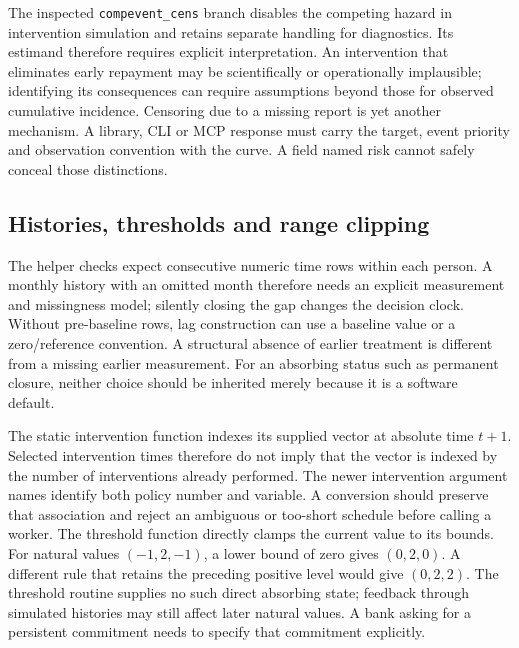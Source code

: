 The inspected \texttt{compevent\_cens} branch disables the competing hazard in intervention simulation and retains separate handling for diagnostics. Its estimand therefore requires explicit interpretation. An intervention that eliminates early repayment may be scientifically or operationally implausible; identifying its consequences can require assumptions beyond those for observed cumulative incidence. Censoring due to a missing report is yet another mechanism. A library, CLI or MCP response must carry the target, event priority and observation convention with the curve. A field named risk cannot safely conceal those distinctions.

\subsection{Histories, thresholds and range clipping}
\label{exec20:gformula-history}
The helper checks expect consecutive numeric time rows within each person. A monthly history with an omitted month therefore needs an explicit measurement and missingness model; silently closing the gap changes the decision clock. Without pre-baseline rows, lag construction can use a baseline value or a zero/reference convention. A structural absence of earlier treatment is different from a missing earlier measurement. For an absorbing status such as permanent closure, neither choice should be inherited merely because it is a software default.~\citep{exec20_gformula_reuse}

The static intervention function indexes its supplied vector at absolute time $t+1$. Selected intervention times therefore do not imply that the vector is indexed by the number of interventions already performed. The newer intervention argument names identify both policy number and variable. A conversion should preserve that association and reject an ambiguous or too-short schedule before calling a worker. The threshold function directly clamps the current value to its bounds. For natural values $(-1,2,-1)$, a lower bound of zero gives $(0,2,0)$. A different rule that retains the preceding positive level would give $(0,2,2)$. The threshold routine supplies no such direct absorbing state; feedback through simulated histories may still affect later natural values. A bank asking for a persistent commitment needs to specify that commitment explicitly.~\citep{exec20_gformula_reuse,exec20_gformula_reference}

